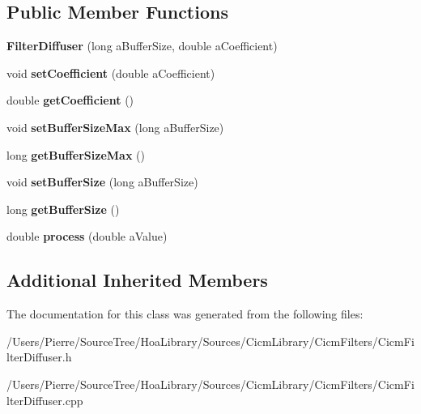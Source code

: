 \subsection*{Public Member Functions}
\begin{DoxyCompactItemize}
\item 
\hypertarget{class_filter_diffuser_a5f7ad7932fbb9342a0e47cb9394a86c6}{{\bfseries Filter\-Diffuser} (long a\-Buffer\-Size, double a\-Coefficient)}\label{class_filter_diffuser_a5f7ad7932fbb9342a0e47cb9394a86c6}

\item 
\hypertarget{class_filter_diffuser_ad7cb6afc1aab4676b0c59a3c52b44531}{void {\bfseries set\-Coefficient} (double a\-Coefficient)}\label{class_filter_diffuser_ad7cb6afc1aab4676b0c59a3c52b44531}

\item 
\hypertarget{class_filter_diffuser_a725c280342822037cd00900effa2dbf2}{double {\bfseries get\-Coefficient} ()}\label{class_filter_diffuser_a725c280342822037cd00900effa2dbf2}

\item 
\hypertarget{class_filter_diffuser_ad37c35fb2cfbc9c5021fa68684fb209a}{void {\bfseries set\-Buffer\-Size\-Max} (long a\-Buffer\-Size)}\label{class_filter_diffuser_ad37c35fb2cfbc9c5021fa68684fb209a}

\item 
\hypertarget{class_filter_diffuser_a8af3a7fbd945af6c2c5be4b66998f1dd}{long {\bfseries get\-Buffer\-Size\-Max} ()}\label{class_filter_diffuser_a8af3a7fbd945af6c2c5be4b66998f1dd}

\item 
\hypertarget{class_filter_diffuser_a062dc2d293746ddad2f274fac403d0fc}{void {\bfseries set\-Buffer\-Size} (long a\-Buffer\-Size)}\label{class_filter_diffuser_a062dc2d293746ddad2f274fac403d0fc}

\item 
\hypertarget{class_filter_diffuser_aeb3d5ee67babb7089a89f8e40daaf2e7}{long {\bfseries get\-Buffer\-Size} ()}\label{class_filter_diffuser_aeb3d5ee67babb7089a89f8e40daaf2e7}

\item 
\hypertarget{class_filter_diffuser_af1dec2a29fad45d60a97e859e84c5214}{double {\bfseries process} (double a\-Value)}\label{class_filter_diffuser_af1dec2a29fad45d60a97e859e84c5214}

\end{DoxyCompactItemize}
\subsection*{Additional Inherited Members}


The documentation for this class was generated from the following files\-:\begin{DoxyCompactItemize}
\item 
/\-Users/\-Pierre/\-Source\-Tree/\-Hoa\-Library/\-Sources/\-Cicm\-Library/\-Cicm\-Filters/Cicm\-Filter\-Diffuser.\-h\item 
/\-Users/\-Pierre/\-Source\-Tree/\-Hoa\-Library/\-Sources/\-Cicm\-Library/\-Cicm\-Filters/Cicm\-Filter\-Diffuser.\-cpp\end{DoxyCompactItemize}
